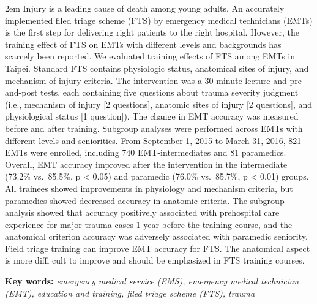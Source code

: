 \documentclass[
  20pt
]{article}
\begin{document}
\begin{minipage}{15cm}
    \vspace{5ex}
    



    {\parindent 2em Injury is a leading cause of death among young adults. An accurately
implemented filed triage scheme (FTS) by emergency medical technicians
(EMTs) is the first step for delivering right patients to the right
hospital. However, the training effect of FTS on EMTs with different
levels and backgrounds has scarcely been reported. We evaluated training
effects of FTS among EMTs in Taipei. Standard FTS contains physiologic
status, anatomical sites of injury, and mechanism of injury criteria.
The intervention was a 30-minute lecture and pre-and-post tests, each
containing five questions about trauma severity judgment (i.e.,
mechanism of injury {[}2 questions{]}, anatomic sites of injury {[}2
questions{]}, and physiological status {[}1 question{]}). The change in
EMT accuracy was measured before and after training. Subgroup analyses
were performed across EMTs with different levels and seniorities. From
September 1, 2015 to March 31, 2016, 821 EMTs were enrolled, including
740 EMT-intermediates and 81 paramedics. Overall, EMT accuracy improved
after the intervention in the intermediate (73.2\% vs.~85.5\%, p
\textless{} 0.05) and paramedic (76.0\% vs.~85.7\%, p \textless{} 0.01)
groups. All trainees showed improvements in physiology and mechanism
criteria, but paramedics showed decreased accuracy in anatomic criteria.
The subgroup analysis showed that accuracy positively associated with
prehospital care experience for major trauma cases 1 year before the
training course, and the anatomical criterion accuracy was adversely
associated with paramedic seniority. Field triage training can improve
EMT accuracy for FTS. The anatomical aspect is more diffi cult to
improve and should be emphasized in FTS training courses.}

    \vspace{1em}
    \textbf{Key words:} \textit{emergency medical service (EMS), emergency
medical technician (EMT), education and training, filed triage scheme
(FTS), trauma}

\end{minipage}

\vspace{2em}

\setlength{\parindent}{2em}
\end{document}

